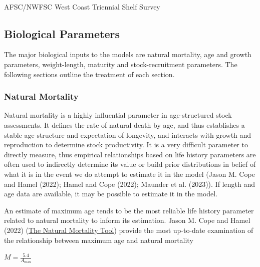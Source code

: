 \documentclass[
]{scrartcl}
\makeatletter
\let\oldparagraph\paragraph
\renewcommand{\paragraph}{
    \@ifstar
      \xxxParagraphStar
      \xxxParagraphNoStar
  }
\newcommand{\xxxParagraphStar}[1]{\oldparagraph*{#1}\mbox{}}
\newcommand{\xxxParagraphNoStar}[1]{\oldparagraph{#1}\mbox{}}
\makeatother
\begin{document}
\paragraph{AFSC/NWFSC West Coast Triennial Shelf
Survey}\label{afscnwfsc-west-coast-triennial-shelf-survey-1}

\subsection{Biological Parameters}\label{biological-parameters}

The major biological inputs to the models are natural mortality, age and
growth parameters, weight-length, maturity and stock-recruitment
parameters. The following sections outline the treatment of each
section.

\subsubsection{Natural Mortality}\label{natural-mortality}

Natural mortality is a highly influential parameter in age-structured
stock assessments. It defines the rate of natural death by age, and thus
establishes a stable age-structure and expectation of longevity, and
interacts with growth and reproduction to determine stock productivity.
It is a very difficult parameter to directly measure, thus empirical
relationships based on life history parameters are often used to
indirectly determine its value or build prior distributions in belief of
what it is in the event we do attempt to estimate it in the model (Jason
M. Cope and Hamel (2022); Hamel and Cope (2022); Maunder et al. (2023)).
If length and age data are available, it may be possible to estimate it
in the model.

An estimate of maximum age tends to be the most reliable life history
parameter related to natural mortality to inform its estimation. Jason
M. Cope and Hamel (2022)
(\href{https://connect.fisheries.noaa.gov/natural-mortality-tool/}{The
Natural Mortality Tool}) provide the most up-to-date examination of the
relationship between maximum age and natural mortality

\begin{centering}

$M=\frac{5.4}{A_{\text{max}}}$

\end{centering}

\vspace{0.5cm}
\end{document}
